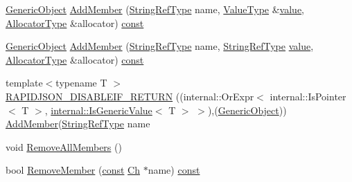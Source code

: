 \begin{DoxyCompactItemize}
\item 
\mbox{\hyperlink{classrapidjson_1_1_generic_object}{Generic\+Object}} \mbox{\hyperlink{classrapidjson_1_1_generic_object_ad0bc0d524c95b4e7eb816843ac40f264}{Add\+Member}} (\mbox{\hyperlink{classrapidjson_1_1_generic_object_ab47bc8d841321d77c140e9df729f5233}{String\+Ref\+Type}} name, \mbox{\hyperlink{classrapidjson_1_1_generic_object_a282660500748eff5ebab93b88a9d478f}{Value\+Type}} \&\mbox{\hyperlink{classrapidjson_1_1_generic_object_afdba35584d4b33d5ab8c0c460f49c0a4}{value}}, \mbox{\hyperlink{classrapidjson_1_1_generic_object_ae30003e248368737382eed69ec8fe1eb}{Allocator\+Type}} \&allocator) \mbox{\hyperlink{classrapidjson_1_1_generic_object_a3524fcb5f36c034aabd8afa19fc16d9e}{const}}
\item 
\mbox{\hyperlink{classrapidjson_1_1_generic_object}{Generic\+Object}} \mbox{\hyperlink{classrapidjson_1_1_generic_object_a2222165c8e1d29b8a6f534a8b54a2115}{Add\+Member}} (\mbox{\hyperlink{classrapidjson_1_1_generic_object_ab47bc8d841321d77c140e9df729f5233}{String\+Ref\+Type}} name, \mbox{\hyperlink{classrapidjson_1_1_generic_object_ab47bc8d841321d77c140e9df729f5233}{String\+Ref\+Type}} \mbox{\hyperlink{classrapidjson_1_1_generic_object_afdba35584d4b33d5ab8c0c460f49c0a4}{value}}, \mbox{\hyperlink{classrapidjson_1_1_generic_object_ae30003e248368737382eed69ec8fe1eb}{Allocator\+Type}} \&allocator) \mbox{\hyperlink{classrapidjson_1_1_generic_object_a3524fcb5f36c034aabd8afa19fc16d9e}{const}}
\item 
{\footnotesize template$<$typename T $>$ }\\\mbox{\hyperlink{classrapidjson_1_1_generic_object_a37ca81cfe9b1f26856ebae811dd5d65f}{R\+A\+P\+I\+D\+J\+S\+O\+N\+\_\+\+D\+I\+S\+A\+B\+L\+E\+I\+F\+\_\+\+R\+E\+T\+U\+RN}} ((internal\+::\+Or\+Expr$<$ internal\+::\+Is\+Pointer$<$ T $>$, \mbox{\hyperlink{structrapidjson_1_1internal_1_1_is_generic_value}{internal\+::\+Is\+Generic\+Value}}$<$ T $>$ $>$),(\mbox{\hyperlink{classrapidjson_1_1_generic_object}{Generic\+Object}})) \mbox{\hyperlink{classrapidjson_1_1_generic_object_ae811070cbc37cc67bb80a8bdb7d6db14}{Add\+Member}}(\mbox{\hyperlink{classrapidjson_1_1_generic_object_ab47bc8d841321d77c140e9df729f5233}{String\+Ref\+Type}} name
\item 
void \mbox{\hyperlink{classrapidjson_1_1_generic_object_adce47ea944260d77171c710f34d4e402}{Remove\+All\+Members}} ()
\item 
bool \mbox{\hyperlink{classrapidjson_1_1_generic_object_aa96ab7566d9d7cce166d8b51cd072b92}{Remove\+Member}} (\mbox{\hyperlink{classrapidjson_1_1_generic_object_a3524fcb5f36c034aabd8afa19fc16d9e}{const}} \mbox{\hyperlink{classrapidjson_1_1_generic_object_a947f543afbdd5e6d1c5b2dd1fe5a6e60}{Ch}} $\ast$name) \mbox{\hyperlink{classrapidjson_1_1_generic_object_a3524fcb5f36c034aabd8afa19fc16d9e}{const}}

\end{DoxyCompactItemize}
